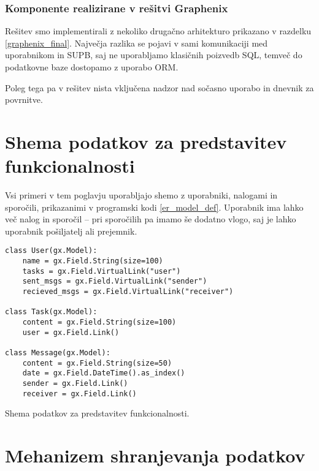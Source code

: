 \documentclass[a4paper,12pt,openright]{book}
\begin{document}
    \subsubsection{Komponente realizirane v rešitvi Graphenix}

    Rešitev smo implementirali z nekoliko drugačno arhitekturo prikazano v razdelku \ref{graphenix_final}.
    Največja razlika se pojavi v sami komunikaciji med uporabnikom in SUPB, saj ne uporabljamo klasičnih poizvedb SQL, temveč do podatkovne baze dostopamo z uporabo ORM.

    Poleg tega pa v rešitev nista vključena nadzor nad sočasno uporabo in dnevnik za povrnitve.
    
    \section{Shema podatkov za predstavitev funkcionalnosti}
    
    Vsi primeri v tem poglavju uporabljajo shemo z uporabniki, nalogami in sporočili, prikazanimi v programski kodi \ref{er_model_def}. Uporabnik ima lahko več nalog in sporočil – pri sporočilih pa imamo še dodatno vlogo, saj je lahko uporabnik pošiljatelj ali prejemnik.

\begin{code}
\begin{verbatim}
class User(gx.Model):
    name = gx.Field.String(size=100)
    tasks = gx.Field.VirtualLink("user")
    sent_msgs = gx.Field.VirtualLink("sender")
    recieved_msgs = gx.Field.VirtualLink("receiver")

class Task(gx.Model):
    content = gx.Field.String(size=100)
    user = gx.Field.Link()

class Message(gx.Model):
    content = gx.Field.String(size=50)
    date = gx.Field.DateTime().as_index()
    sender = gx.Field.Link()
    receiver = gx.Field.Link()
\end{verbatim}
\caption{Shema podatkov za predstavitev funkcionalnosti.}
\label{er_model_def}
\end{code}
    
    \section{Mehanizem shranjevanja podatkov}
\end{document}
